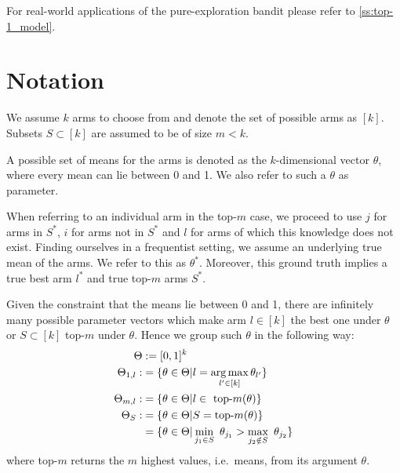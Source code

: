 For real-world applications of the pure-exploration bandit please refer to
\ref{ss:top-1_model}.

\section{Notation}\label{section:notation}
We assume $k$ arms to choose from and denote the set of possible arms as $[k]$.
Subsets $S \subset [k]$ are assumed to be of size $m < k$.

A possible set of means for the arms is denoted as the $k$-dimensional vector
$\theta$, where every mean can lie between 0 and 1. We also refer to such a
$\theta$ as parameter.

When referring to an individual arm in the top-$m$ case, we proceed to use $j$
for arms in $S^*$, $i$ for arms not in $S^*$ and $l$ for arms of which this
knowledge does not exist. Finding ourselves in a frequentist setting, we assume
an underlying true mean of the arms. We refer to this as $\theta^*$. Moreover,
this ground truth implies a true best arm $l^*$ and true top-$m$ arms $S^*$.

Given the constraint that the means lie between 0 and 1, there are infinitely
many possible parameter vectors which make arm $l \in [k]$ the best one under
$\theta$ or $S \subset [k]$ top-$m$ under $\theta$. Hence we group such $\theta$
in the following way:
\begin{align}
  \Theta &:= [0, 1]^k \\
  \Theta_{1, l} :&= \{\theta \in \Theta | l = \operatorname*{arg\,max}_{l' \in [k]}
      \theta_{l'}\} \\
  \Theta_{m, l} :&= \{\theta \in \Theta | l \in \text{ top-}m(\theta)\} \\
  \Theta_S :&= \{\theta \in \Theta | S = \text{top-}m(\theta)\} \\
    &= \{ \theta \in \Theta| \min_{j_1 \in S}\ \theta_{j_1} > \max_{j_2 \notin
      S}\ \theta_{j_2}\}
\end{align}
where top-$m$ returns the $m$ highest values, i.e.\ means, from its argument
$\theta$.

